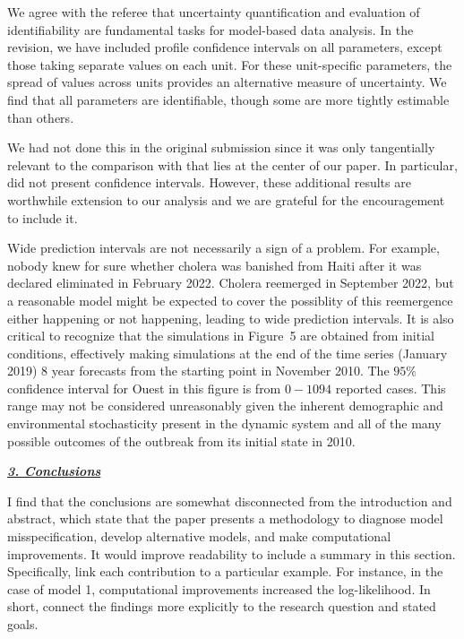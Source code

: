 \documentclass[11pt]{article}
\newcommand\report[1]{{\color{mygreen} \vspace{1mm}\hspace{0.25in}\parbox{6in}{\em #1}}}
\begin{document}
We agree with the referee that uncertainty quantification and evaluation of identifiability are fundamental tasks for model-based data analysis.
In the revision, we have included profile confidence intervals on all parameters, except those taking separate values on each unit.
For these unit-specific parameters, the spread of values across units provides an alternative measure of uncertainty.
We find that all parameters are identifiable, though some are more tightly estimable than others.

We had not done this in the original submission since it was only tangentially relevant to the comparison with \cite{lee20} that lies at the center of our paper.
In particular, \cite{lee20} did not present confidence intervals.
However, these additional results are worthwhile extension to our analysis and we are grateful for the encouragement to include it.

Wide prediction intervals are not necessarily a sign of a problem.
For example, nobody knew for sure whether cholera was banished from Haiti after it was declared eliminated in February 2022.
Cholera reemerged in September 2022, but a reasonable model might be expected to cover the possiblity of this reemergence either happening or not happening, leading to wide prediction intervals.
It is also critical to recognize that the simulations in Figure~5 are obtained from initial conditions, effectively making simulations at the end of the time series (January 2019) 8 year forecasts from the starting point in November 2010. 
The $95\%$ confidence interval for Ouest in this figure is from $0-1094$ reported cases. This range may not be considered unreasonably given the inherent demographic and environmental stochasticity present in the dynamic system and all of the many possible outcomes of the outbreak from its initial state in 2010.

\report{
  \textbf{\underline{3. Conclusions}}

  I find that the conclusions are somewhat disconnected from the introduction and abstract, which state that the paper presents a methodology to diagnose model misspecification, develop alternative models, and make computational improvements. It would improve readability to include a summary in this section. Specifically, link each contribution to a particular example. For instance, in the case of model 1, computational improvements increased the log-likelihood. In short, connect the findings more explicitly to the research question and stated goals.
}
\end{document}
